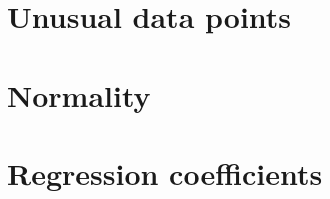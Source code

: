 \documentclass{sigchi}
\begin{document}
\section{Unusual data points} %
\label{sec:unusual_data_points}
\hfill \break

\clearpage

\section{Normality} %
\label{app:normality}
\hfill \break

\clearpage

\section{Regression coefficients} %
\label{sec:regression_coefficients}
\hfill \break

\end{document}
